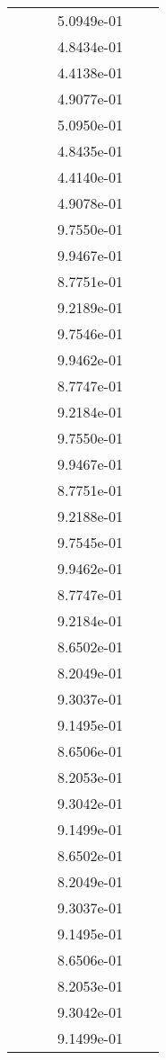 \begin{xltabular}{\textwidth}{r|rS[table-format=1.3e+2]S[table-format=1.4e+2]S[table-format=1.4e+2]S[table-format=-1.5]}
&  &  & 5.0949e-01 & & \\
&  &  & 4.8434e-01 & & \\
&  &  & 4.4138e-01 & & \\
&  &  & 4.9077e-01 & & \\
&  &  & 5.0950e-01 & & \\
&  &  & 4.8435e-01 & & \\
&  &  & 4.4140e-01 & & \\
&  &  & 4.9078e-01 & & \\
&  &  & 9.7550e-01 & & \\
&  &  & 9.9467e-01 & & \\
&  &  & 8.7751e-01 & & \\
&  &  & 9.2189e-01 & & \\
&  &  & 9.7546e-01 & & \\
&  &  & 9.9462e-01 & & \\
&  &  & 8.7747e-01 & & \\
&  &  & 9.2184e-01 & & \\
&  &  & 9.7550e-01 & & \\
&  &  & 9.9467e-01 & & \\
&  &  & 8.7751e-01 & & \\
&  &  & 9.2188e-01 & & \\
&  &  & 9.7545e-01 & & \\
&  &  & 9.9462e-01 & & \\
&  &  & 8.7747e-01 & & \\
&  &  & 9.2184e-01 & & \\
&  &  & 8.6502e-01 & & \\
&  &  & 8.2049e-01 & & \\
&  &  & 9.3037e-01 & & \\
&  &  & 9.1495e-01 & & \\
&  &  & 8.6506e-01 & & \\
&  &  & 8.2053e-01 & & \\
&  &  & 9.3042e-01 & & \\
&  &  & 9.1499e-01 & & \\
&  &  & 8.6502e-01 & & \\
&  &  & 8.2049e-01 & & \\
&  &  & 9.3037e-01 & & \\
&  &  & 9.1495e-01 & & \\
&  &  & 8.6506e-01 & & \\
&  &  & 8.2053e-01 & & \\
&  &  & 9.3042e-01 & & \\
&  &  & 9.1499e-01 & & \\

\end{xltabular}
